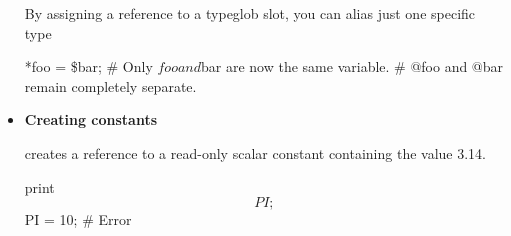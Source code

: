 \documentclass{report}
\begin{document}
\begin{itemize}
            \bigbreak \noindent 
            By assigning a reference to a typeglob slot, you can alias just one specific type
            \bigbreak \noindent 
            \begin{perlcode}
                *foo = \$bar; 
                # Only $foo and $bar are now the same variable. 
                # @foo and @bar remain completely separate.
            \end{perlcode}
        \item \textbf{Creating constants}
            \bigbreak \noindent 
            \bigbreak \noindent 
            creates a reference to a read-only scalar constant containing the value 3.14.
            \bigbreak \noindent 
            \begin{perlcode}
            print $$PI;
            $$PI = 10; # Error
            \end{perlcode}


\end{itemize}
\end{document}
